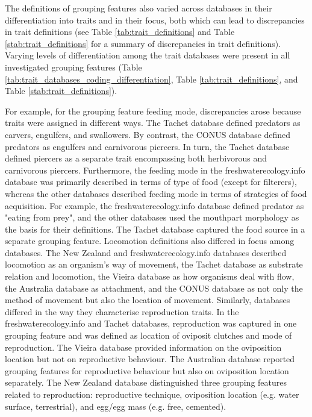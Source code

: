 \documentclass[12pt]{article}
\begin{document}
The definitions of grouping features also varied across databases in their differentiation into traits and in their focus, both which can lead to discrepancies in trait definitions (see Table \ref{tab:trait_definitions} and Table \ref{stab:trait_definitions} for a summary of discrepancies in trait definitions). Varying levels of differentiation among the trait databases were present in all investigated grouping features (Table \ref{tab:trait_databases_coding_differentiation}, Table \ref{tab:trait_definitions}, and Table \ref{stab:trait_definitions}).

For example, for the grouping feature feeding mode, discrepancies arose because traits were assigned in different ways. The Tachet database defined predators as carvers, engulfers, and swallowers. By contrast, the CONUS database defined predators as engulfers and carnivorous piercers. In turn, the Tachet database defined piercers as a separate trait encompassing both herbivorous and carnivorous piercers. Furthermore, the feeding mode in the freshwaterecology.info database was primarily described in terms of type of food (except for filterers), whereas the other databases described feeding mode in terms of strategies of food acquisition. For example, the freshwaterecology.info database defined predator as "eating from prey", and the other databases used the mouthpart morphology as the basis for their definitions. The Tachet database captured the food source in a separate grouping feature. Locomotion definitions also differed in focus among databases. The New Zealand and freshwaterecology.info databases described locomotion as an organism’s way of movement, the Tachet database as substrate relation and locomotion, the Vieira database as how organisms deal with flow, the Australia database as attachment, and the CONUS database as not only the method of movement but also the location of movement. Similarly, databases differed in the way they characterise reproduction traits. In the freshwaterecology.info and Tachet databases, reproduction was captured in one grouping feature and was defined as location of oviposit clutches and mode of reproduction. The Vieira database provided information on the oviposition location but not on reproductive behaviour. The Australian database reported grouping features for reproductive behaviour but also on oviposition location separately. The New Zealand database distinguished three grouping features related to reproduction: reproductive technique, oviposition location (e.g. water surface, terrestrial), and egg/egg mass (e.g. free, cemented).
\end{document}
